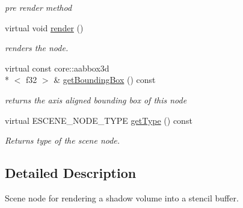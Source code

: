 \begin{DoxyCompactItemize}
\begin{DoxyCompactList}\small\item\em pre render method \end{DoxyCompactList}\item 
\hypertarget{classirr_1_1scene_1_1_c_shadow_volume_scene_node_ab07d7fcb4341fc56bed5393306e44070}{virtual void \hyperlink{classirr_1_1scene_1_1_c_shadow_volume_scene_node_ab07d7fcb4341fc56bed5393306e44070}{render} ()}\label{classirr_1_1scene_1_1_c_shadow_volume_scene_node_ab07d7fcb4341fc56bed5393306e44070}

\begin{DoxyCompactList}\small\item\em renders the node. \end{DoxyCompactList}\item 
\hypertarget{classirr_1_1scene_1_1_c_shadow_volume_scene_node_a304cac4805760acad661db6261c92f4a}{virtual const core\-::aabbox3d\\*
$<$ f32 $>$ \& \hyperlink{classirr_1_1scene_1_1_c_shadow_volume_scene_node_a304cac4805760acad661db6261c92f4a}{get\-Bounding\-Box} () const }\label{classirr_1_1scene_1_1_c_shadow_volume_scene_node_a304cac4805760acad661db6261c92f4a}

\begin{DoxyCompactList}\small\item\em returns the axis aligned bounding box of this node \end{DoxyCompactList}\item 
\hypertarget{classirr_1_1scene_1_1_c_shadow_volume_scene_node_a81874863146307182005f4ecef0fff28}{virtual E\-S\-C\-E\-N\-E\-\_\-\-N\-O\-D\-E\-\_\-\-T\-Y\-P\-E \hyperlink{classirr_1_1scene_1_1_c_shadow_volume_scene_node_a81874863146307182005f4ecef0fff28}{get\-Type} () const }\label{classirr_1_1scene_1_1_c_shadow_volume_scene_node_a81874863146307182005f4ecef0fff28}

\begin{DoxyCompactList}\small\item\em Returns type of the scene node. \end{DoxyCompactList}\end{DoxyCompactItemize}


\subsection{Detailed Description}
Scene node for rendering a shadow volume into a stencil buffer. 

